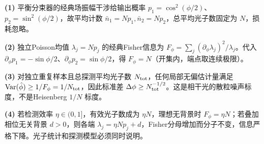 \par\noindent\textbf{(1)} 平衡分束器的经典场振幅干涉给输出概率 \(p_1=\cos^2(\phi/2)\)、\(p_2=\sin^2(\phi/2)\)，故平均计数 \(\bar n_1=Np_1,\bar n_2=Np_2\)，总平均光子数固定为 \(N\)，损耗忽略。
\par\noindent\textbf{(2)} 独立Poisson均值 \(\lambda_j=Np_j\) 的经典Fisher信息为 \(F_\phi=\sum_j(\partial_\phi\lambda_j)^2/\lambda_j\)。代入 \(\partial_\phi p_1=-\sin\phi/2\)、\(\partial_\phi p_2=\sin\phi/2\)，得 \(F_\phi=N\)（开集内，端点取连续极限）。
\par\noindent\textbf{(3)} 对独立重复样本且总探测平均光子数 \(N_{\rm tot}\)，任何局部无偏估计量满足 \(\operatorname{Var}(\hat\phi)\ge1/F_\phi=1/N_{\rm tot}\)，因此标准差 \(\Delta\phi\ge N_{\rm tot}^{-1/2}\)。这是相干光的散粒噪声标度，不是Heisenberg \(1/N\) 标度。
\par\noindent\textbf{(4)} 若检测效率 \(\eta\in(0,1]\)，有效光子数成为 \(\eta N\)，理想无背景时 \(F_\phi=\eta N\)；若叠加相位无关背景 \(d>0\)，则各端 \(\lambda_j=\eta Np_j+d\)，Fisher分母增加而分子不变，信息严格下降。光子统计和探测模型必须同时说明。
